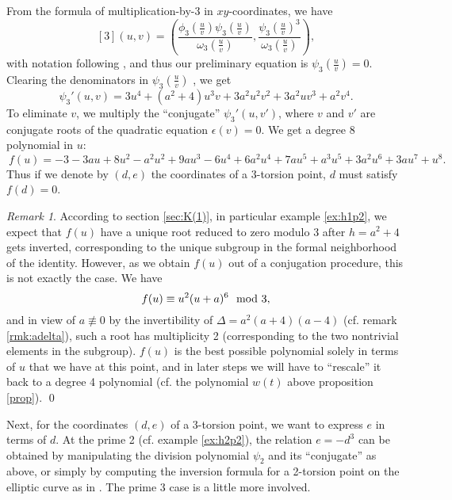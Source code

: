\documentclass{gtpart}
\theoremstyle{definition}
\theoremstyle{remark}
\newtheorem{rmk}[thm]{Remark}
\begin{document}
From the formula of multiplication-by-3 in $xy$-coordinates, we have 
\[
 [3](u,v) = \left( 
 \frac{\phi_3(\frac{u}{v})\psi_3(\frac{u}{v})}{\omega_3(\frac{u}{v})}, 
 \frac{\psi_3(\frac{u}{v})^3}{\omega_3(\frac{u}{v})}\right), 
\]
with notation following \cite[exercise 3.7(d)]{AEC}, and thus our preliminary 
equation is $\psi_3(\frac{u}{v}) = 0$.  Clearing the denominators in 
$\psi_3(\frac{u}{v})$ , we get 
\[
 \psi_3'(u,v) = 3u^4 + (a^2 + 4) u^3 v + 3a^2 u^2 v^2 + 3a^2 u v^3 + a^2 v^4.  
\]
To eliminate $v$, we multiply the ``conjugate'' $\psi_3'(u,v')$, where $v$ and 
$v'$ are conjugate roots of the quadratic equation $\epsilon(v) = 0$.  We get 
a degree 8 polynomial in $u$: 
\[
 ~f(u) = -3 - 3 a u + 8 u^2 - a^2 u^2 + 9 a u^3 - 6 u^4 + 6 a^2 u^4 + 7 a u^5 
 + a^3 u^5 + 3 a^2 u^6 + 3 a u^7 + u^8.  
\]
Thus if we denote by $(d,e)$ the coordinates of a 3-torsion point, $d$ must 
satisfy $f(d) = 0$.  
\begin{rmk}
\label{rmk:rescale}
 According to section \ref{sec:K(1)}, in particular example \ref{ex:h1p2}, we 
 expect that $f(u)$ have a unique root reduced to zero modulo 3 after 
 $h = a^2 + 4$ gets inverted, corresponding to the unique subgroup in the 
 formal neighborhood of the identity.  However, as we obtain $f(u)$ out of a 
 conjugation procedure, this is not exactly the case.  We have 
 \[
  f(u) \equiv u^2 (u + a)^6~~{\rm mod}~3, 
 \]
 and in view of $a \not\equiv 0$ by the invertibility of $\Delta = 
 a^2(a + 4)(a - 4)$ (cf. remark \ref{rmk:adelta}), such a root has 
 multiplicity 2 (corresponding to the two nontrivial elements in the 
 subgroup).  $f(u)$ is the best possible polynomial solely in terms of $u$ 
 that we have at this point, and in later steps we will have to ``rescale'' it 
 back to a degree 4 polynomial (cf. the polynomial $w(t)$ above proposition 
 \ref{prop}).  \qed
\end{rmk}

Next, for the coordinates $(d,e)$ of a 3-torsion point, we want to express $e$ 
in terms of $d$.  At the prime 2 (cf. example \ref{ex:h2p2}), the relation 
$e = -d^3$ can be obtained by manipulating the division polynomial $\psi_2$ 
and its ``conjugate'' as above, or simply by computing the inversion formula 
for a 2-torsion point on the elliptic curve as in \cite[section 3]{h2p2}.  The 
prime 3 case is a little more involved.  
\end{document}
